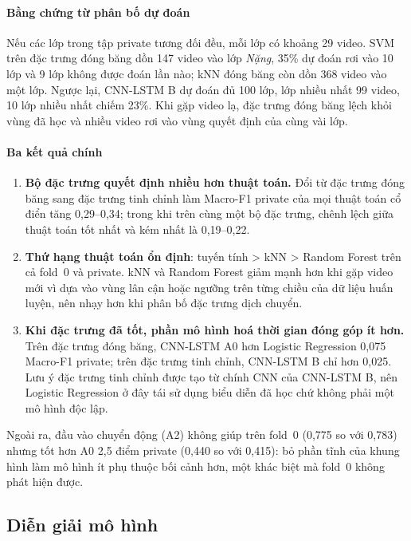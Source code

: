 \paragraph*{Bằng chứng từ phân bố dự đoán} Nếu các lớp trong tập private tương đối đều, mỗi lớp có khoảng 29 video. SVM trên đặc trưng đóng băng dồn 147 video vào lớp \textit{Nặng}, 35\% dự đoán rơi vào 10 lớp và 9 lớp không được đoán lần nào; kNN đóng băng còn dồn 368 video vào một lớp. Ngược lại, CNN-LSTM B dự đoán đủ 100 lớp, lớp nhiều nhất 99 video, 10 lớp nhiều nhất chiếm 23\%. Khi gặp video lạ, đặc trưng đóng băng lệch khỏi vùng đã học và nhiều video rơi vào vùng quyết định của cùng vài lớp.

\paragraph*{Ba kết quả chính}
\begin{enumerate}
  \item \textbf{Bộ đặc trưng quyết định nhiều hơn thuật toán.} Đổi từ đặc trưng đóng băng sang đặc trưng tinh chỉnh làm Macro-F1 private của mọi thuật toán cổ điển tăng 0,29--0,34; trong khi trên cùng một bộ đặc trưng, chênh lệch giữa thuật toán tốt nhất và kém nhất là 0,19--0,22.
  \item \textbf{Thứ hạng thuật toán ổn định}: tuyến tính > kNN > Random Forest trên cả fold~0 và private. kNN và Random Forest giảm mạnh hơn khi gặp video mới vì dựa vào vùng lân cận hoặc ngưỡng trên từng chiều của dữ liệu huấn luyện, nên nhạy hơn khi phân bố đặc trưng dịch chuyển.
  \item \textbf{Khi đặc trưng đã tốt, phần mô hình hoá thời gian đóng góp ít hơn.} Trên đặc trưng đóng băng, CNN-LSTM A0 hơn Logistic Regression 0,075 Macro-F1 private; trên đặc trưng tinh chỉnh, CNN-LSTM B chỉ hơn 0,025. Lưu ý đặc trưng tinh chỉnh được tạo từ chính CNN của CNN-LSTM B, nên Logistic Regression ở đây tái sử dụng biểu diễn đã học chứ không phải một mô hình độc lập.
\end{enumerate}
Ngoài ra, đầu vào chuyển động (A2) không giúp trên fold~0 (0,775 so với 0,783) nhưng tốt hơn A0 2,5 điểm private (0,440 so với 0,415): bỏ phần tĩnh của khung hình làm mô hình ít phụ thuộc bối cảnh hơn, một khác biệt mà fold~0 không phát hiện được.

\subsection{Diễn giải mô hình}
\label{subsec:res_explain}

